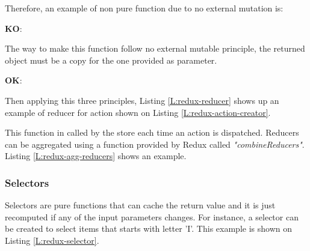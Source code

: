 \begin{codefigure}
\end{codefigure}

Therefore, an example of non pure function due to no external mutation is:

\begin{center}
	\textbf{KO}: 
\end{center}

The way to make this function follow no external mutable principle, the returned
object must be a copy for the one provided as parameter.

\begin{center}
	\textbf{OK}: 
\end{center}

Then applying this three principles, Listing \ref{L:redux-reducer} shows up an
example of reducer for action shown on Listing \ref{L:redux-action-creator}.

\begin{codefigure}
\end{codefigure}

This function in called by the store each time an action is dispatched. 
Reducers can be aggregated using a function provided by Redux called
\textit{"combineReducers"}. Listing \ref{L:redux-agg-reducers} shows an example.

\begin{codefigure}
\end{codefigure}

\subsubsection{Selectors}
\label{S:selectors}

Selectors are pure functions that can cache the return value and it is just 
recomputed if any of the input parameters changes. For instance, a selector
can be created to select items that starts with letter 'I'. This example is
shown on Listing \ref{L:redux-selector}.

\begin{codefigure}
\end{codefigure}

